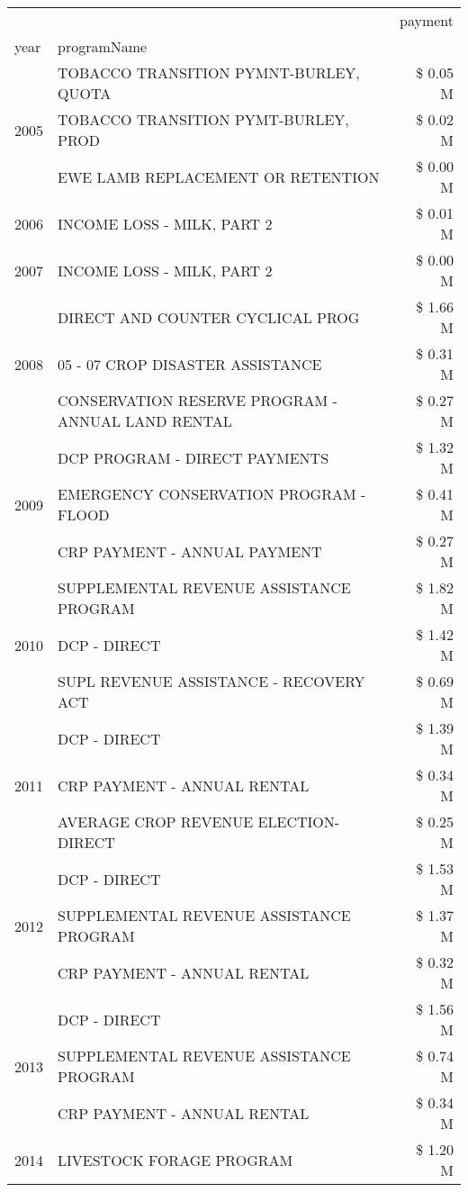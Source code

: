 \begin{tabular}{llr}
\toprule
 &  & payment \\
year & programName &  \\
\midrule
\multirow[t]{3}{*}{2005} & TOBACCO TRANSITION PYMNT-BURLEY, QUOTA & \$ 0.05 M \\
 & TOBACCO TRANSITION PYMT-BURLEY, PROD & \$ 0.02 M \\
 & EWE LAMB REPLACEMENT OR RETENTION & \$ 0.00 M \\
\cline{1-3}
2006 & INCOME LOSS - MILK, PART 2 & \$ 0.01 M \\
\cline{1-3}
2007 & INCOME LOSS - MILK, PART 2 & \$ 0.00 M \\
\cline{1-3}
\multirow[t]{3}{*}{2008} & DIRECT AND COUNTER CYCLICAL PROG & \$ 1.66 M \\
 & 05 - 07 CROP DISASTER ASSISTANCE & \$ 0.31 M \\
 & CONSERVATION RESERVE PROGRAM - ANNUAL LAND RENTAL & \$ 0.27 M \\
\cline{1-3}
\multirow[t]{3}{*}{2009} & DCP PROGRAM - DIRECT PAYMENTS & \$ 1.32 M \\
 & EMERGENCY CONSERVATION PROGRAM - FLOOD & \$ 0.41 M \\
 & CRP PAYMENT - ANNUAL PAYMENT & \$ 0.27 M \\
\cline{1-3}
\multirow[t]{3}{*}{2010} & SUPPLEMENTAL REVENUE ASSISTANCE PROGRAM & \$ 1.82 M \\
 & DCP - DIRECT & \$ 1.42 M \\
 & SUPL REVENUE ASSISTANCE - RECOVERY ACT & \$ 0.69 M \\
\cline{1-3}
\multirow[t]{3}{*}{2011} & DCP - DIRECT & \$ 1.39 M \\
 & CRP PAYMENT - ANNUAL RENTAL & \$ 0.34 M \\
 & AVERAGE CROP REVENUE ELECTION-DIRECT & \$ 0.25 M \\
\cline{1-3}
\multirow[t]{3}{*}{2012} & DCP - DIRECT & \$ 1.53 M \\
 & SUPPLEMENTAL REVENUE ASSISTANCE PROGRAM & \$ 1.37 M \\
 & CRP PAYMENT - ANNUAL RENTAL & \$ 0.32 M \\
\cline{1-3}
\multirow[t]{3}{*}{2013} & DCP - DIRECT & \$ 1.56 M \\
 & SUPPLEMENTAL REVENUE ASSISTANCE PROGRAM & \$ 0.74 M \\
 & CRP PAYMENT - ANNUAL RENTAL & \$ 0.34 M \\
\cline{1-3}
\multirow[t]{2}{*}{2014} & LIVESTOCK FORAGE PROGRAM & \$ 1.20 M \\

\end{tabular}

